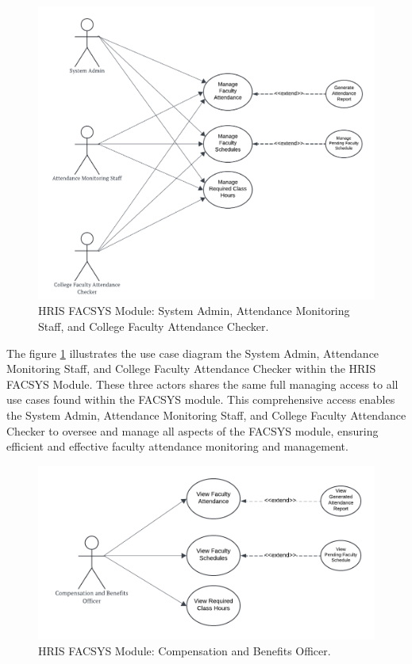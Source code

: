     \begin{figure}[H]
        \centering
        \includegraphics[width=0.9\linewidth]{figures/images/use-case-fac-1.png}
        \caption{HRIS FACSYS Module: System Admin, Attendance Monitoring Staff, and College Faculty Attendance Checker.}
        \label{fig:use-case-fac-1}
    \end{figure}

    The figure \ref{fig:use-case-fac-1} illustrates the use case diagram the System Admin, Attendance Monitoring Staff, and College Faculty Attendance Checker within the HRIS FACSYS Module. These three actors shares the same full managing access to all use cases found within the FACSYS module. This comprehensive access enables the System Admin, Attendance Monitoring Staff, and College Faculty Attendance Checker to oversee and manage all aspects of the FACSYS module, ensuring efficient and effective faculty attendance monitoring and management.

    \begin{figure}[H]
        \centering
        \includegraphics[width=0.9\linewidth]{figures/images/use-case-fac-2.png}
        \caption{HRIS FACSYS Module: Compensation and Benefits Officer.}
        \label{fig:use-case-fac-2}
    \end{figure}

